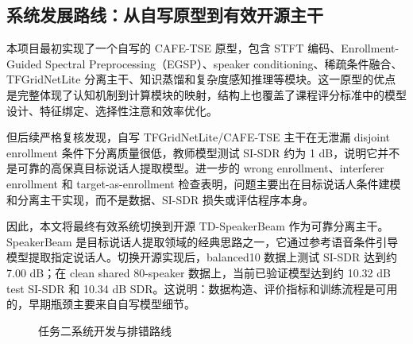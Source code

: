 \documentclass[UTF8,zihao=-4,a4paper]{ctexart}
\begin{document}
\subsection{系统发展路线：从自写原型到有效开源主干}

本项目最初实现了一个自写的 CAFE-TSE 原型，包含 STFT 编码、Enrollment-Guided Spectral Preprocessing（EGSP）、speaker conditioning、稀疏条件融合、TFGridNetLite 分离主干、知识蒸馏和复杂度感知推理等模块。这一原型的优点是完整体现了认知机制到计算模块的映射，结构上也覆盖了课程评分标准中的模型设计、特征绑定、选择性注意和效率优化。

但后续严格复核发现，自写 TFGridNetLite/CAFE-TSE 主干在无泄漏 disjoint enrollment 条件下分离质量很低，教师模型测试 SI-SDR 约为 1 dB，说明它并不是可靠的高保真目标说话人提取模型。进一步的 wrong enrollment、interferer enrollment 和 target-as-enrollment 检查表明，问题主要出在目标说话人条件建模和分离主干实现，而不是数据、SI-SDR 损失或评估程序本身。

因此，本文将最终有效系统切换到开源 TD-SpeakerBeam 作为可靠分离主干。SpeakerBeam 是目标说话人提取领域的经典思路之一，它通过参考语音条件引导模型提取指定说话人\cite{zmolikova2019speakerbeam}。切换开源实现后，balanced10 数据上测试 SI-SDR 达到约 7.00 dB；在 clean shared 80-speaker 数据上，当前已验证模型达到约 10.32 dB test SI-SDR 和 10.34 dB SDR。这说明：数据构造、评价指标和训练流程是可用的，早期瓶颈主要来自自写模型细节。

\begin{figure}[htbp]
\centering
{}
\caption{任务二系统开发与排错路线}
\label{fig:tse_debug_route}
\end{figure}
\end{document}
